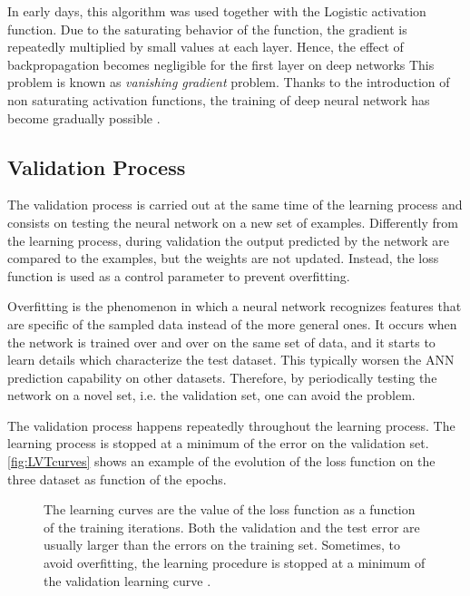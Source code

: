 In early days, this algorithm was used together with the Logistic activation function.
Due to the saturating behavior of the function, the gradient is repeatedly multiplied by small values at each layer.
Hence, the effect of backpropagation becomes negligible for the first layer on deep networks
This problem is known as \textit{vanishing gradient} problem.
Thanks to the introduction of non saturating activation functions, the training of deep neural network has become gradually possible \cite{krizhevsky2012imagenet}.

\subsection{Validation Process}
\label{ssec:Validation_Process}
The validation process is carried out at the same time of the learning process and consists on testing the neural network on a new set of examples.
Differently from the learning process, during validation the output predicted by the network are compared to the examples, but the weights are not updated.
Instead, the loss function is used as a control parameter to prevent overfitting.

Overfitting is the phenomenon in which a neural network recognizes features that are specific of the sampled data instead of the more general ones.
It occurs when the network is trained over and over on the same set of data, and it starts to learn details which characterize the test dataset.
This typically worsen the \acs{ANN} prediction capability on other datasets.
Therefore, by periodically testing the network on a novel set, i.e. the validation set, one can avoid the problem.

The validation process happens repeatedly throughout the learning process. %
The learning process is stopped at a minimum of the error on the validation set.
\autoref{fig:LVTcurves} shows an example of the evolution of the loss function on the three dataset as function of the epochs.

\begin{figure}[htbp]
	\centering
	
	\caption{The learning curves are the value of the loss function as a function of the training iterations.
	Both the validation and the test error are usually larger than the errors on the training set.
	Sometimes, to avoid overfitting, the learning procedure is stopped at a minimum of the validation learning curve \cite{duda2012pattern}.
	}
	\label{fig:LVTcurves}
\end{figure}

